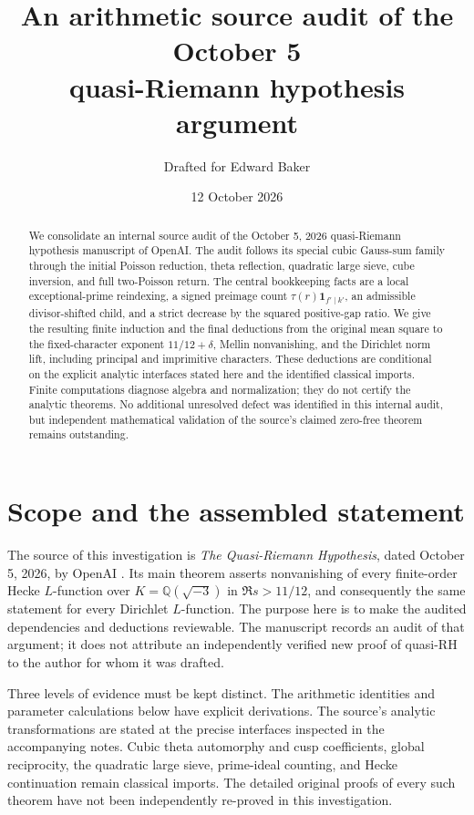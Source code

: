 \documentclass[11pt]{article}
\title{An arithmetic source audit of the October 5\\
quasi-Riemann hypothesis argument}
\author{Drafted for Edward Baker}
\date{12 October 2026}
\numberwithin{equation}{section}
\theoremstyle{definition}
\theoremstyle{remark}
\newcommand{\ind}{\mathbf 1}
\begin{document}
\maketitle

\begin{abstract}
We consolidate an internal source audit of the October 5, 2026
quasi-Riemann hypothesis manuscript of OpenAI. The audit follows its
special cubic Gauss-sum family through the initial Poisson reduction,
theta reflection, quadratic large sieve, cube inversion, and full
two-Poisson return. The central bookkeeping facts are a local
exceptional-prime reindexing, a signed preimage count
\(\tau(r)\ind_{f'\mid k'}\), an admissible divisor-shifted child, and a
strict decrease by the squared positive-gap ratio. We give the
resulting finite induction and the final deductions from the original
mean square to the fixed-character exponent \(11/12+\delta\), Mellin
nonvanishing, and the Dirichlet norm lift, including principal and
imprimitive characters. These deductions are conditional on the
explicit analytic interfaces stated here and the identified classical
imports. Finite computations diagnose algebra and normalization; they
do not certify the analytic theorems. No additional unresolved defect
was identified in this internal audit, but independent mathematical
validation of the source's claimed zero-free theorem remains outstanding.
\end{abstract}

\tableofcontents

\section{Scope and the assembled statement}\label{sec:scope}

The source of this investigation is \emph{The Quasi-Riemann Hypothesis},
dated October 5, 2026, by OpenAI \cite{Source}. Its main theorem asserts
nonvanishing of every finite-order Hecke \(L\)-function over
\(K=\mathbb Q(\sqrt{-3})\) in \(\Re s>11/12\), and consequently
the same statement for every Dirichlet \(L\)-function. The purpose
here is to make the audited dependencies and deductions reviewable.
The manuscript records an audit of that argument; it does not attribute
an independently verified new proof of quasi-RH to the author for whom
it was drafted.

Three levels of evidence must be kept distinct. The arithmetic
identities and parameter calculations below have explicit derivations.
The source's analytic transformations are stated at the precise
interfaces inspected in the accompanying notes. Cubic theta automorphy
and cusp coefficients, global reciprocity, the quadratic large sieve,
prime-ideal counting, and Hecke continuation remain classical imports.
The detailed original proofs of every such theorem have not been
independently re-proved in this investigation.
\end{document}

